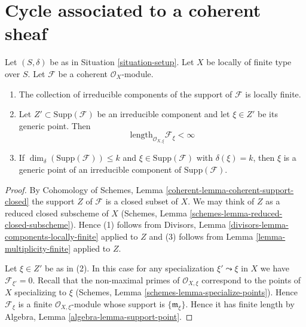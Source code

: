 \section{Cycle associated to a coherent sheaf}
\label{section-cycle-of-coherent-sheaf}



\begin{lemma}
\label{lemma-length-finite}
Let $(S, \delta)$ be as in Situation \ref{situation-setup}.
Let $X$ be locally of finite type over $S$.
Let $\mathcal{F}$ be a coherent $\mathcal{O}_X$-module.
\begin{enumerate}
\item The collection of irreducible components of the support of
$\mathcal{F}$ is locally finite.
\item Let $Z' \subset \text{Supp}(\mathcal{F})$
be an irreducible component and
let $\xi \in Z'$ be its generic point.
Then
$$
\text{length}_{\mathcal{O}_{X, \xi}} \mathcal{F}_\xi < \infty
$$
\item If $\dim_\delta(\text{Supp}(\mathcal{F})) \leq k$
and $\xi \in \text{Supp}(\mathcal{F})$ with $\delta(\xi) = k$, then $\xi$ is a
generic point of an irreducible component of $\text{Supp}(\mathcal{F})$.
\end{enumerate}
\end{lemma}

\begin{proof}
By Cohomology of Schemes, Lemma \ref{coherent-lemma-coherent-support-closed}
the support $Z$ of $\mathcal{F}$ is a closed subset of $X$.
We may think of $Z$ as a reduced closed subscheme of $X$
(Schemes, Lemma \ref{schemes-lemma-reduced-closed-subscheme}).
Hence (1) follows from
Divisors, Lemma \ref{divisors-lemma-components-locally-finite} applied to $Z$
and (3) follows from
Lemma \ref{lemma-multiplicity-finite} applied to $Z$.

\medskip\noindent
Let $\xi \in Z'$ be as in (2). In this case for any specialization
$\xi' \leadsto \xi$ in $X$ we have $\mathcal{F}_{\xi'} = 0$.
Recall that the non-maximal primes of $\mathcal{O}_{X, \xi}$ correspond
to the points of $X$ specializing to $\xi$
(Schemes, Lemma \ref{schemes-lemma-specialize-points}).
Hence $\mathcal{F}_\xi$ is a finite $\mathcal{O}_{X, \xi}$-module
whose support is $\{\mathfrak m_\xi\}$. Hence it has finite length
by Algebra, Lemma \ref{algebra-lemma-support-point}.
\end{proof}

